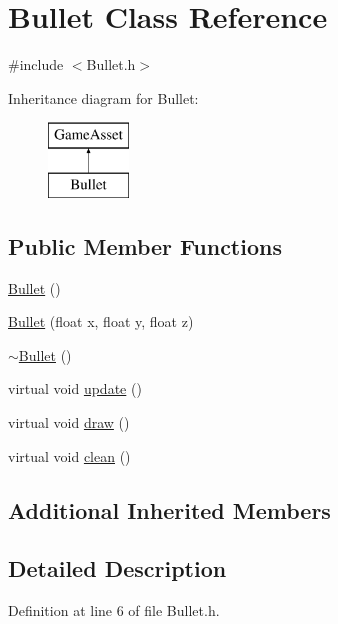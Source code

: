 \hypertarget{classBullet}{\section{Bullet Class Reference}
\label{classBullet}
}


{\ttfamily \#include $<$Bullet.\-h$>$}

Inheritance diagram for Bullet\-:\begin{figure}[H]
\begin{center}
\leavevmode
\includegraphics[height=2.000000cm]{classBullet}
\end{center}
\end{figure}
\subsection*{Public Member Functions}
\begin{DoxyCompactItemize}
\item 
\hyperlink{classBullet_acd7befc0bc18907cc1d871d37bbdddeb}{Bullet} ()
\item 
\hyperlink{classBullet_aead3bc218cbfec02093a0546bef197d6}{Bullet} (float x, float y, float z)
\item 
\hyperlink{classBullet_aaeb5cb41d7db89f49007b08b41f1bfcf}{$\sim$\-Bullet} ()
\item 
virtual void \hyperlink{classBullet_a32f4a0611fe2dd245fee955d14ca1f68}{update} ()
\item 
virtual void \hyperlink{classBullet_a3912974232447f64002fd657340a7b3b}{draw} ()
\item 
virtual void \hyperlink{classBullet_a1a4ffaed3fe46e010bb981ebbbd38ecd}{clean} ()
\end{DoxyCompactItemize}
\subsection*{Additional Inherited Members}


\subsection{Detailed Description}


Definition at line 6 of file Bullet.\-h.



